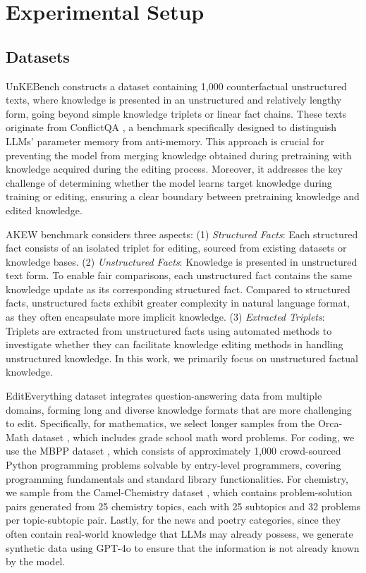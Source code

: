 \section{Experimental Setup}\label{app:exp}
\subsection{Datasets}
UnKEBench \cite{UnKE} constructs a dataset containing 1,000 counterfactual unstructured texts, where knowledge is presented in an unstructured and relatively lengthy form, going beyond simple knowledge triplets or linear fact chains. These texts originate from ConflictQA \cite{conflictqa}, a benchmark specifically designed to distinguish LLMs' parameter memory from anti-memory. This approach is crucial for preventing the model from merging knowledge obtained during pretraining with knowledge acquired during the editing process. Moreover, it addresses the key challenge of determining whether the model learns target knowledge during training or editing, ensuring a clear boundary between pretraining knowledge and edited knowledge.

AKEW benchmark \cite{AKEW} considers three aspects: (1) \textit{Structured Facts}: Each structured fact consists of an isolated triplet for editing, sourced from existing datasets or knowledge bases. (2) \textit{Unstructured Facts}: Knowledge is presented in unstructured text form. To enable fair comparisons, each unstructured fact contains the same knowledge update as its corresponding structured fact. Compared to structured facts, unstructured facts exhibit greater complexity in natural language format, as they often encapsulate more implicit knowledge. (3) \textit{Extracted Triplets}: Triplets are extracted from unstructured facts using automated methods to investigate whether they can facilitate knowledge editing methods in handling unstructured knowledge. In this work, we primarily focus on unstructured factual knowledge.

EditEverything dataset integrates question-answering data from multiple domains, forming long and diverse knowledge formats that are more challenging to edit. Specifically, for mathematics, we select longer samples from the Orca-Math dataset \cite{math}, which includes grade school math word problems. For coding, we use the MBPP dataset \cite{code}, which consists of approximately 1,000 crowd-sourced Python programming problems solvable by entry-level programmers, covering programming fundamentals and standard library functionalities. For chemistry, we sample from the Camel-Chemistry dataset \cite{chemistry}, which contains problem-solution pairs generated from 25 chemistry topics, each with 25 subtopics and 32 problems per topic-subtopic pair. Lastly, for the news and poetry categories, since they often contain real-world knowledge that LLMs may already possess, we generate synthetic data using GPT-4o to ensure that the information is not already known by the model.

